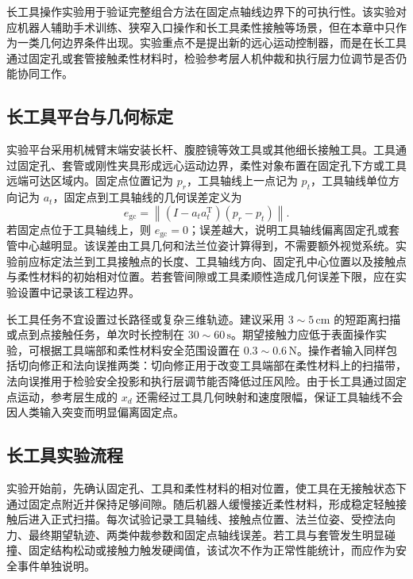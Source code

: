 长工具操作实验用于验证完整组合方法在固定点轴线边界下的可执行性。该实验对应机器人辅助手术训练、狭窄入口操作和长工具柔性接触等场景，但在本章中只作为一类几何边界条件出现。实验重点不是提出新的远心运动控制器，而是在长工具通过固定孔或套管接触柔性材料时，检验参考层人机仲裁和执行层力位调节是否仍能协同工作。

\subsection{长工具平台与几何标定}
\label{subsec:ch5_long_tool_platform}

实验平台采用机械臂末端安装长杆、腹腔镜等效工具或其他细长接触工具。工具通过固定孔、套管或刚性夹具形成远心运动边界，柔性对象布置在固定孔下方或工具远端可达区域内。固定点位置记为 $p_r$，工具轴线上一点记为 $p_t$，工具轴线单位方向记为 $a_t$，固定点到工具轴线的几何误差定义为
\begin{equation}
  e_{\mathrm{gc}}=
  \left\|
  \left(I-a_ta_t^{\mathrm T}\right)(p_r-p_t)
  \right\|.
  \label{eq:ch5_gc_distance_experiment}
\end{equation}
若固定点位于工具轴线上，则 $e_{\mathrm{gc}}=0$；误差越大，说明工具轴线偏离固定孔或套管中心越明显。该误差由工具几何和法兰位姿计算得到，不需要额外视觉系统。实验前应标定法兰到工具接触点的长度、工具轴线方向、固定孔中心位置以及接触点与柔性材料的初始相对位置。若套管间隙或工具柔顺性造成几何误差下限，应在实验设置中记录该工程边界。

长工具任务不宜设置过长路径或复杂三维轨迹。建议采用 $3\sim5\,\mathrm{cm}$ 的短距离扫描或点到点接触任务，单次时长控制在 $30\sim60\,\mathrm{s}$。期望接触力应低于表面操作实验，可根据工具端部和柔性材料安全范围设置在 $0.3\sim0.6\,\mathrm{N}$。操作者输入同样包括切向修正和法向误推两类：切向修正用于改变工具端部在柔性材料上的扫描带，法向误推用于检验安全投影和执行层调节能否降低过压风险。由于长工具通过固定点运动，参考层生成的 $x_d$ 还需经过工具几何映射和速度限幅，保证工具轴线不会因人类输入突变而明显偏离固定点。

\subsection{长工具实验流程}
\label{subsec:ch5_long_tool_protocol}

实验开始前，先确认固定孔、工具和柔性材料的相对位置，使工具在无接触状态下通过固定点附近并保持足够间隙。随后机器人缓慢接近柔性材料，形成稳定轻触接触后进入正式扫描。每次试验记录工具轴线、接触点位置、法兰位姿、受控法向力、最终期望轨迹、两类仲裁参数和固定点轴线误差。若工具与套管发生明显碰撞、固定结构松动或接触力触发硬阈值，该试次不作为正常性能统计，而应作为安全事件单独说明。

